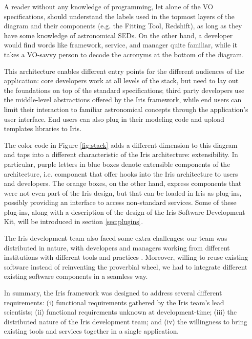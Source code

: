 \documentclass[final,5p,authoryear]{elsarticle}
\begin{document}
A reader without any knowledge of programming, let alone of the VO
specifications, should understand the labels used in the topmost layers of the
diagram and their components (e.g. the Fitting Tool, Redshift), as long as they
have some knowledge of astronomical SEDs. On the other hand, a developer would
find words like framework, service, and manager quite familiar, while it takes a
VO-savvy person to decode the acronyms at the bottom of the diagram.


This architecture enables different entry points for the different audiences of the
application: core developers work at all levels of the stack, but need to lay
out the foundations on top of the standard specifications; third party
developers use the middle-level abstractions offered by the Iris framework,
while end users can limit their interaction to familiar astronomical concepts
through the application's user interface. End users can also plug in their
modeling code and upload templates libraries to Iris.

The color code in Figure \ref{fig:stack} adds a different dimension to this
diagram and taps into a different characteristic of the Iris architecture:
extensibility. In particular, purple letters in blue boxes denote extensible
components of the architecture, i.e. component that offer hooks into the Iris
architecture to users and developers. The orange boxes, on the other hand,
express components that were not even part of the Iris design, but that can be
loaded in Iris as plug-ins, possibly providing an interface to access
non-standard services. Some of these plug-ins, along with a description of the
design of the Iris Software Development Kit, will be introduced in section
\ref{sec:plugins}.

The Iris development team also faced some extra challenges: our team was
distributed in nature, with developers and managers working from different
institutions with different tools and practices \citep{2012SPIE.8449E..0IE}.
Moreover, willing to reuse existing software instead of reinventing the
proverbial wheel, we had to integrate different existing software components in
a seamless way.

In summary, the Iris framework was designed to address several different
requirements: (i) functional requirements gathered by the Iris team's lead
scientists; (ii) functional requirements unknown at development-time; (iii) the
distributed nature of the Iris development team; and (iv) the willingness to
bring existing tools and services together in a single application.
\end{document}
